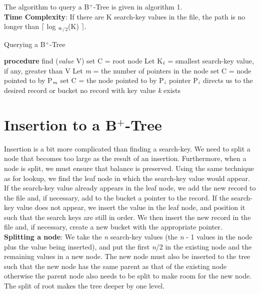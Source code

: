 \documentclass[11pt, oneside, a4paper]{article}
\begin{document}
The algorithm to query a B$^+$-Tree is given in algorithm 1.\\
\textbf{Time Complexity}:  If there are K search-key values in the file, the path is no longer than $\lceil$ log $_\emph{n}$$_/$$_2$(K)
$\rceil$.

\begin{algorithm}
\caption{Querying a B$^+$-Tree}
\label{alg1}
\begin{algorithmic}[1]
\STATE \textbf{procedure} find (\emph{value} V)
\STATE set C = root node
\STATE Let K$_\emph{i}$ = smallest search-key value, if any, greater than V
\STATE Let \emph{m} = the number of pointers in the node
\STATE set C = node pointed to by P$_\emph{m}$
\ELSE
\STATE set C = the node pointed to by P$_\emph{i}$
\ENDIF
\ENDWHILE
{}
\STATE pointer P$_\emph{i}$ directs us to the desired record or bucket
\ELSE
\STATE no record with key value \emph{k} exists
\ENDIF
\end{algorithmic}
\end{algorithm}

\section{Insertion to a B$^+$-Tree}
Insertion is a bit more complicated than finding a search-key.  We need to split a node that becomes too large as the result of an insertion.  Furthermore, when a node is split, we must ensure that balance is preserved.  Using the same technique as for lookup, we find the leaf node in which the search-key value would appear. If the search-key value already appears in the leaf node, we add the new record to the file and, if necessary, add to the bucket a pointer to the record. If the search-key value does not appear, we insert the value in the leaf node, and position it such that the search keys are still in order. We then insert the new record in the file and, if necessary, create a new bucket with the appropriate pointer.\\
\textbf{Splitting a node}:  We take the \emph{n} search-key values (the \emph{n} - 1 values in the node plus the value being inserted), and put the first \emph{n}/2 in the existing node and the remaining values in a new node. The new node must also be inserted to the tree such that the new node has the same parent as that of the existing node otherwise the parent node also needs to be split to make room for the new node.  The split of root makes the tree deeper by one level.
\end{document}
